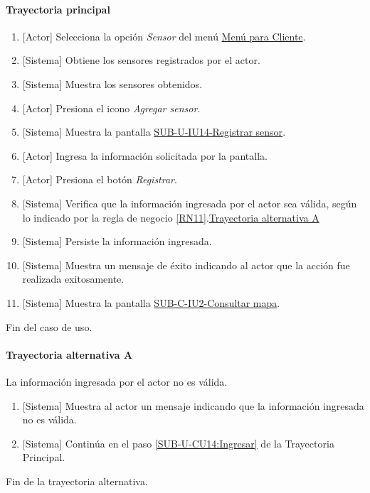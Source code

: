 \paragraph{Trayectoria principal}
	\begin{enumerate}
		\item {[Actor]} Selecciona la opción \textit{Sensor} del menú \hyperref[fig:menu-cliente]{Menú para Cliente}.
		\item {[Sistema]} Obtiene los sensores registrados por el actor.
		\item {[Sistema]} Muestra los sensores obtenidos.
		\item {[Actor]} Presiona el icono \textit{Agregar sensor}.
		\item {[Sistema]} Muestra la pantalla \hyperref[fig:sub-u-iu14]{SUB-U-IU14-Registrar sensor}.
		\item \label{SUB-U-CU14:Ingresar} {[Actor]} Ingresa la información solicitada por la pantalla.
		\item {[Actor]} Presiona el botón \textit{Registrar}.
		\item {[Sistema]} Verifica que la información ingresada por el actor sea válida, según lo indicado por la regla de negocio \ref{RN11}.\hyperref[SUB-U-CU14:TA]{Trayectoria alternativa A}
		\item {[Sistema]} Persiste la información ingresada.
		\item {[Sistema]} Muestra un mensaje de éxito indicando al actor que la acción fue realizada exitosamente.
		\item \label{SUB-U-CU14:Pantalla} {[Sistema]} Muestra la pantalla \hyperref[fig:sub-c-iu2]{SUB-C-IU2-Consultar mapa}.
	\end{enumerate}
	Fin del caso de uso.

\paragraph{Trayectoria alternativa A} \label{SUB-U-CU14:TA}
	La información ingresada por el actor no es válida.
	\begin{enumerate}[label=A\arabic*.]
		\item {[Sistema]} Muestra al actor un mensaje indicando que la información ingresada no es válida.
		\item {[Sistema]} Continúa en el paso \ref{SUB-U-CU14:Ingresar} de la Trayectoria Principal.
	\end{enumerate}
	Fin de la trayectoria alternativa.

